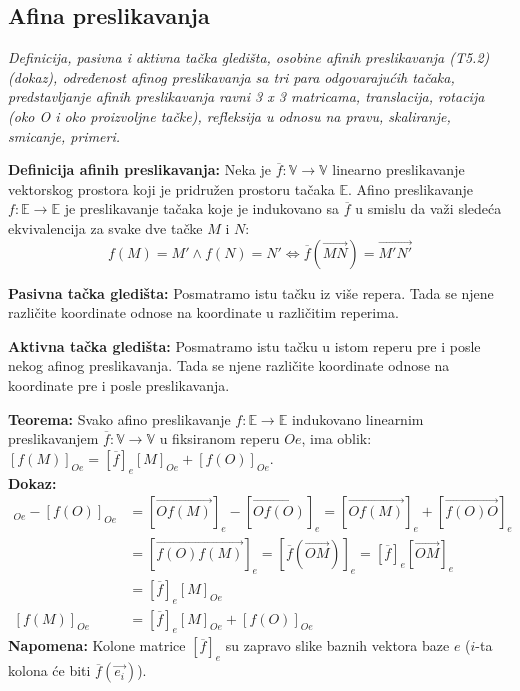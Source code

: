 \documentclass[12pt]{article}
\newcommand{\vek}[1]{\overrightarrow{#1}}
\begin{document}
\subsection{Afina preslikavanja}
\textit{Definicija, pasivna i aktivna tačka gledišta, osobine afinih preslikavanja
    (T5.2) (dokaz), određenost afinog preslikavanja sa tri para odgovarajućih
    tačaka, predstavljanje afinih preslikavanja ravni 3 x 3 matricama, translacija,
    rotacija (oko O i oko proizvoljne tačke), refleksija u odnosu na pravu,
    skaliranje, smicanje, primeri.}
\par
\vspace*{1cm}

\textbf{Definicija afinih preslikavanja:} Neka je
$\overline{f}: \mathbb{V}\rightarrow\mathbb{V}$ linearno preslikavanje
vektorskog prostora koji je pridružen prostoru tačaka $\mathbb{E}$. Afino
preslikavanje $f: \mathbb{E}\rightarrow\mathbb{E}$ je preslikavanje tačaka koje
je indukovano sa $\overline{f}$ u smislu da važi sledeća ekvivalencija za svake
dve tačke $M$ i $N$:
$$f(M)=M'\land f(N)=N' \iff \overline{f}(\vek{MN})=\vek{M'N'}$$
\par

\textbf{Pasivna tačka gledišta:} Posmatramo istu tačku iz više repera. Tada se
njene različite koordinate odnose na koordinate u različitim reperima.
\par

\textbf{Aktivna tačka gledišta:} Posmatramo istu tačku u istom reperu pre i
posle nekog afinog preslikavanja. Tada se njene različite koordinate odnose na
koordinate pre i posle preslikavanja.

\textbf{Teorema:} Svako afino preslikavanje
$f:\mathbb{E}\rightarrow\mathbb{E}$ indukovano linearnim preslikavanjem
$\overline{f}:\mathbb{V}\rightarrow\mathbb{V}$ u fiksiranom reperu $Oe$, ima oblik:
$[f(M)]_{Oe}=[\overline{f}]_{e}[M]_{Oe}+[f(O)]_{Oe}$.\\
\textbf{Dokaz:}
\begin{align*}
    [f(M)]_{Oe}-[f(O)]_{Oe} & =[\vek{Of(M)}]_e-[\vek{Of(O)}]_e =[\vek{Of(M)}]_e+[\vek{f(O)O}]_e            \\
                            & =[\vek{f(O)f(M)}]_e=[\overline{f}(\vek{OM})]_e =[\overline{f}]_e[\vek{OM}]_e \\
                            & =[\overline{f}]_e[M]_{Oe}                                                    \\
    [f(M)]_{Oe}             & =[\overline{f}]_{e}[M]_{Oe}+[f(O)]_{Oe}
\end{align*}
\textbf{Napomena:} Kolone matrice $[\overline{f}]_e$ su zapravo slike baznih
vektora baze $e$ ($i$-ta kolona će biti $\overline{f}(\vek{e_i})$).
\par
\end{document}
